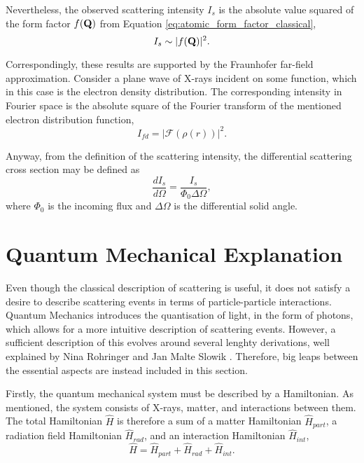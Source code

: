 Nevertheless, the observed scattering intensity $I_{s}$ is the absolute value squared of the form factor $f(\bm{\mathrm{Q}})$ from Equation \eqref{eq:atomic_form_factor_classical},
\begin{equation}\label{eq:scattering_intensity_classical}
    I_{s} \sim |f(\bm{\mathrm{Q}})|^{2}.
\end{equation}

Correspondingly, these results are supported by the Fraunhofer far-field approximation. Consider a plane wave of X-rays incident on some function, which in this case is the electron density distribution.
The corresponding intensity in Fourier space is the absolute square of the Fourier transform of the mentioned electron distribution function,
\begin{equation}\label{eq:Fraunhofer_intensity}
    I_{fd} = |\mathcal{F}\left(\rho(r) \right) |^{2}.
\end{equation}

Anyway, from the definition of the scattering intensity, the differential scattering cross section may be defined as
\begin{equation}\label{eq:scattering_crossection}
    \frac{dI_{s}}{d\Omega} = \frac{I_{s}}{\Phi_{0} \Delta\Omega},
\end{equation}
where $\Phi_{0}$ is the incoming flux and $\Delta\Omega$ is the differential solid angle.



\section{Quantum Mechanical Explanation}\label{sec:quantum_scattering}

Even though the classical description of scattering is useful, it does not satisfy a desire to describe scattering events in terms of particle-particle interactions.
Quantum Mechanics introduces the quantisation of light, in the form of photons, which allows for a more intuitive description of scattering events.
However, a sufficient description of this evolves around several lenghty derivations, well explained by Nina Rohringer \cite{rohringer2020introduction} and Jan Malte Slowik \cite{slowik2015quantum}.
Therefore, big leaps between the essential aspects are instead included in this section.

Firstly, the quantum mechanical system must be described by a Hamiltonian. As mentioned, the system consists of X-rays, matter, and interactions between them.
The total Hamiltonian $\hat{H}$ is therefore a sum of a matter Hamiltonian $\hat{H}_{part}$, a radiation field Hamiltonian $\hat{H}_{rad}$, and an interaction Hamiltonian $\hat{H}_{int}$,
\begin{equation}\label{eq:total_Hamiltonian}
    \hat{H} = \hat{H}_{part} + \hat{H}_{rad} + \hat{H}_{int}.
\end{equation}

